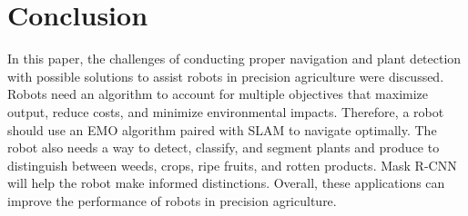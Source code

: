 \documentclass[12pt]{article}
\begin{document}
\section{Conclusion}
In this paper, the challenges of conducting proper navigation and plant detection with possible solutions to assist robots in precision agriculture were discussed. Robots need an algorithm to account for multiple objectives that maximize output, reduce costs, and minimize environmental impacts. Therefore, a robot should use an EMO algorithm paired with SLAM to navigate optimally. The robot also needs a way to detect, classify, and segment plants and produce to distinguish between weeds, crops, ripe fruits, and rotten products. Mask R-CNN will help the robot make informed distinctions. Overall, these applications can improve the performance of robots in precision agriculture.



\end{document}
